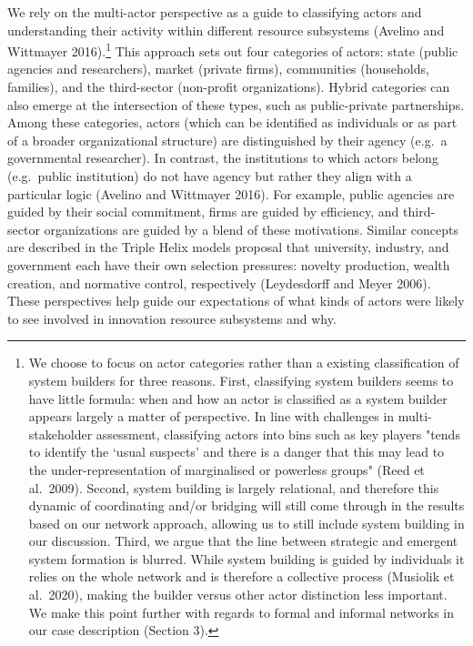 \documentclass[twoside,12pt,final]{ucthesis-CA2012}
\begin{document}
\begin{ucmainmatter}
We rely on the multi-actor perspective as a guide to classifying actors
and understanding their activity within different resource subsystems
(Avelino and Wittmayer 2016).\footnote{We choose to focus on actor categories rather than a existing
  classification of \textquotesingle system builders\textquotesingle{} for three reasons. First,
  classifying system builders seems to have little formula: when and
  how an actor is classified as a system builder appears largely a
  matter of perspective. In line with challenges in multi-stakeholder
  assessment, classifying actors into bins such as key players "tends
  to identify the `usual suspects' and there is a danger that this may
  lead to the under-representation of marginalised or powerless
  groups" (Reed et al.~2009). Second, system building is largely
  relational, and therefore this dynamic of coordinating and/or
  bridging will still come through in the results based on our network
  approach, allowing us to still include system building in our
  discussion. Third, we argue that the line between strategic and
  emergent system formation is blurred. While system building is
  guided by individuals it relies on the whole network and is
  therefore a collective process (Musiolik et al.~2020), making the
  \textquotesingle builder\textquotesingle{} versus \textquotesingle other actor\textquotesingle{} distinction less important. We
  make this point further with regards to formal and informal networks
  in our case description (Section 3).} This approach sets out four categories
of actors: state (public agencies and researchers), market (private
firms), communities (households, families), and the third-sector
(non-profit organizations). Hybrid categories can also emerge at the
intersection of these types, such as public-private partnerships. Among
these categories, actors (which can be identified as individuals or as
part of a broader organizational structure) are distinguished by their
agency (e.g.~a governmental researcher). In contrast, the institutions
to which actors belong (e.g.~public institution) do not have agency but
rather they align with a particular \textquotesingle logic\textquotesingle{} (Avelino and Wittmayer
2016). For example, public agencies are guided by their social
commitment, firms are guided by efficiency, and third-sector
organizations are guided by a blend of these motivations. Similar
concepts are described in the Triple Helix model\textquotesingle s proposal that
university, industry, and government each have their own selection
pressures: novelty production, wealth creation, and normative control,
respectively (Leydesdorff and Meyer 2006). These perspectives help guide
our expectations of what kinds of actors we\textquotesingle re likely to see involved
in innovation resource subsystems and why.


\end{ucmainmatter}
\end{document}
